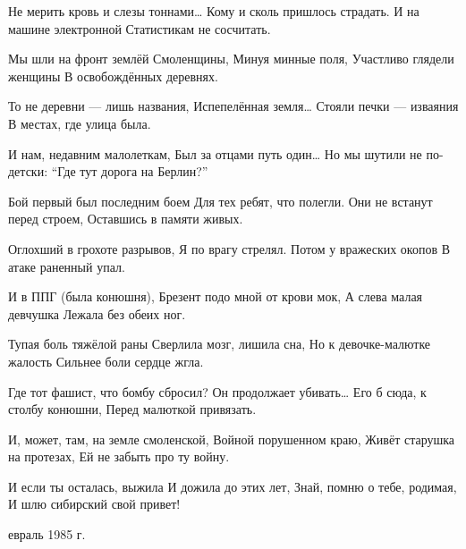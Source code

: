 Не мерить кровь и слезы тоннами\dots
Кому и сколь пришлось страдать.
И на машине электронной
Статистикам не сосчитать.

Мы шли на фронт землёй Смоленщины,
Минуя минные поля,
Участливо глядели женщины
В освобождённых деревнях.

То не деревни --- лишь названия,
Испепелённая земля\dots
Стояли печки --- изваяния
В местах, где улица была.

И нам, недавним малолеткам,
Был за отцами путь один\dots
Но мы шутили не по-детски:
``Где тут дорога на Берлин?''

\vfill\eject

\kern1cm

Бой первый был последним боем
Для тех ребят, что полегли.
Они не встанут перед строем,
Оставшись в памяти живых.

Оглохший в грохоте разрывов,
Я по врагу стрелял.
Потом у вражеских окопов
В атаке раненный упал.

И в ППГ (была конюшня),
Брезент подо мной от крови мок,
А слева малая девчушка
Лежала без обеих ног.

Тупая боль тяжёлой раны
Сверлила мозг, лишила сна,
Но к девочке-малютке жалость
Сильнее боли сердце жгла.

Где тот фашист, что бомбу сбросил?
Он продолжает убивать\dots
Его б сюда, к столбу конюшни,
Перед малюткой привязать.

И, может, там, на земле смоленской,
Войной порушенном краю,
Живёт старушка на протезах,
Ей не забыть про ту войну.

И если ты осталась, выжила
И дожила до этих лет,
Знай, помню о тебе, родимая,
И шлю сибирский свой привет!

\date Февраль 1985 г.

\bye
